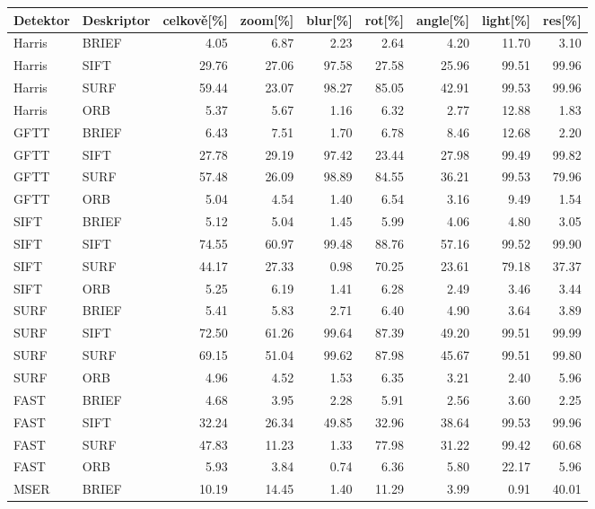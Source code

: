 \begin{table}[htbp]\centering
\begin{tabular}{ l l| r r r r r r r }
	Detektor & Deskriptor & celkově[\%] & zoom[\%] & blur[\%] & rot[\%] & angle[\%] & light[\%] & res[\%] \\
	\hline
	 Harris &  BRIEF & 4.05 & 6.87 & 2.23 & 2.64 & 4.20 & 11.70 & 3.10 \\
	 Harris &  SIFT & 29.76 & 27.06 & 97.58 & 27.58 & 25.96 & 99.51 & 99.96 \\
	 Harris &  SURF & 59.44 & 23.07 & 98.27 & 85.05 & 42.91 & 99.53 & 99.96 \\
	 Harris &  ORB & 5.37 & 5.67 & 1.16 & 6.32 & 2.77 & 12.88 & 1.83 \\
	 GFTT &  BRIEF & 6.43 & 7.51 & 1.70 & 6.78 & 8.46 & 12.68 & 2.20 \\
	 GFTT &  SIFT & 27.78 & 29.19 & 97.42 & 23.44 & 27.98 & 99.49 & 99.82 \\
	 GFTT &  SURF & 57.48 & 26.09 & 98.89 & 84.55 & 36.21 & 99.53 & 79.96 \\
	 GFTT &  ORB & 5.04 & 4.54 & 1.40 & 6.54 & 3.16 & 9.49 & 1.54 \\
	 SIFT &  BRIEF & 5.12 & 5.04 & 1.45 & 5.99 & 4.06 & 4.80 & 3.05 \\
	 SIFT &  SIFT & 74.55 & 60.97 & 99.48 & 88.76 & 57.16 & 99.52 & 99.90 \\
	 SIFT &  SURF & 44.17 & 27.33 & 0.98 & 70.25 & 23.61 & 79.18 & 37.37 \\
	 SIFT &  ORB & 5.25 & 6.19 & 1.41 & 6.28 & 2.49 & 3.46 & 3.44 \\
	 SURF &  BRIEF & 5.41 & 5.83 & 2.71 & 6.40 & 4.90 & 3.64 & 3.89 \\
	 SURF &  SIFT & 72.50 & 61.26 & 99.64 & 87.39 & 49.20 & 99.51 & 99.99 \\
	 SURF &  SURF & 69.15 & 51.04 & 99.62 & 87.98 & 45.67 & 99.51 & 99.80 \\
	 SURF &  ORB & 4.96 & 4.52 & 1.53 & 6.35 & 3.21 & 2.40 & 5.96 \\
	 FAST &  BRIEF & 4.68 & 3.95 & 2.28 & 5.91 & 2.56 & 3.60 & 2.25 \\
	 FAST &  SIFT & 32.24 & 26.34 & 49.85 & 32.96 & 38.64 & 99.53 & 99.96 \\
	 FAST &  SURF & 47.83 & 11.23 & 1.33 & 77.98 & 31.22 & 99.42 & 60.68 \\
	 FAST &  ORB & 5.93 & 3.84 & 0.74 & 6.36 & 5.80 & 22.17 & 5.96 \\
	 MSER &  BRIEF & 10.19 & 14.45 & 1.40 & 11.29 & 3.99 & 0.91 & 40.01 \\

\end{tabular}
\end{table}
